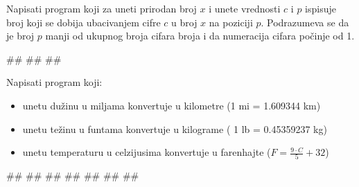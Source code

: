 \begin{Exercise}[label=p1.1_09] 
Napisati program koji za uneti prirodan broj $x$ i unete vrednosti $c$ i $p$ ispisuje broj koji se dobija ubacivanjem cifre $c$  u broj $x$ 
na poziciji $p$. Podrazumeva se da je broj $p$ manji od ukupnog broja cifara broja i da numeracija cifara počinje od 1. \\

\begin{miditest}
\begin{upotreba}{1}
#\naslovInt#
##
##
\end{upotreba}
\end{miditest}
\end{Exercise}
\begin{Answer}[ref=p1.1_09]
\end{Answer}


\begin{Exercise}[label=p1.1_10] 
Napisati program koji:
\begin{itemize}
\item unetu dužinu u miljama konvertuje u kilometre (1 mi = 1.609344 km)
\item unetu težinu u funtama konvertuje u kilograme ( 1 lb = 0.45359237 kg)
\item unetu temperaturu u celzijusima konvertuje u farenhajte ($F=\frac{9\cdot C}{5}+32$)
\end{itemize}

\begin{maxitest}
\begin{upotreba}{1}
#\naslovInt#
##
##
##
##
##
##
\end{upotreba}
\end{maxitest}
\end{Exercise}
\begin{Answer}[ref=p1.1_10]
\end{Answer}

